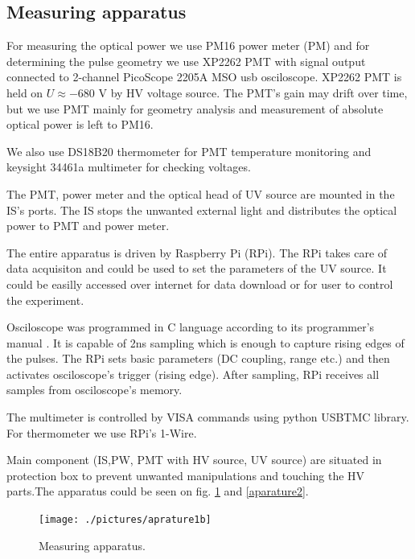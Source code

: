 \subsection{Measuring apparatus}
For measuring the optical power we use PM16 power meter (PM) and for determining the pulse geometry we use XP2262 PMT with signal output connected to 2-channel PicoScope 2205A MSO usb osciloscope. XP2262 PMT is held on $U \approx -680$ V by HV voltage source. The PMT's gain may drift over time, but we use PMT mainly for geometry analysis and measurement of absolute optical power is left to PM16.
\par
We also use DS18B20 thermometer for PMT temperature monitoring and keysight 34461a multimeter for checking voltages.

\par
The PMT, power meter and the optical head of UV source are mounted in the IS's ports. The IS stops the unwanted external light and distributes the optical power to PMT and power meter. 
\par
The entire apparatus is driven by Raspberry Pi (RPi). The RPi takes care of data acquisiton and could be used to set the parameters of the UV source. It could be easilly accessed over internet for data download or for user to control the experiment.
\par
Osciloscope was programmed in C language according to its programmer's manual \cite{PicoScope}. It is capable of 2ns sampling which is enough to capture rising edges of the pulses. The RPi sets basic parameters (DC coupling, range etc.) and then activates osciloscope's trigger (rising edge). After sampling, RPi receives all samples from osciloscope's memory.
\par
The multimeter is controlled by VISA commands using python USBTMC library. For thermometer we use RPi's 1-Wire.
\par
Main component (IS,PW, PMT with HV source, UV source) are situated in protection box to prevent unwanted manipulations and touching the HV parts.The apparatus could be seen on fig. \ref{aparature1} and \ref{aparature2}.

\begin{figure}[H]
 \centering
 \texttt{[image: ./pictures/aprature1b]}
 \caption{Measuring apparatus.}
 \label{aparature1}
\end{figure}

